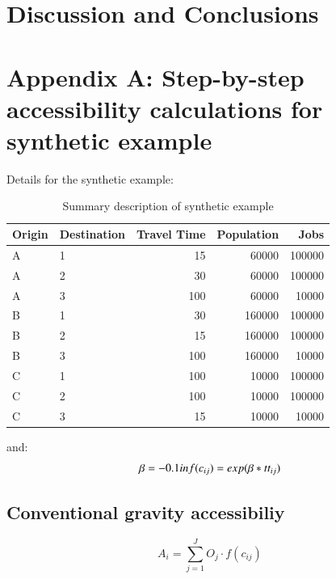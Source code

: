 \documentclass[]{elsarticle} %
\begin{document}
\newpage

\hypertarget{discussion-and-conclusions}{%
\section{Discussion and Conclusions}\label{discussion-and-conclusions}}

\hypertarget{appendix-a-step-by-step-accessibility-calculations-for-synthetic-example}{%
\section{Appendix A: Step-by-step accessibility calculations for
synthetic
example}\label{appendix-a-step-by-step-accessibility-calculations-for-synthetic-example}}

Details for the synthetic example:

\begin{table}

\caption{\label{tab:toy-example-table-appendix}\label{tab:toy-example}Summary description of synthetic example}
\centering
\begin{tabular}[t]{llrrr}
\toprule
Origin & Destination & Travel Time & Population & Jobs\\
\midrule
A & 1 & 15 & 60000 & 100000\\
A & 2 & 30 & 60000 & 100000\\
A & 3 & 100 & 60000 & 10000\\
B & 1 & 30 & 160000 & 100000\\
B & 2 & 15 & 160000 & 100000\\
\addlinespace
B & 3 & 100 & 160000 & 10000\\
C & 1 & 100 & 10000 & 100000\\
C & 2 & 100 & 10000 & 100000\\
C & 3 & 15 & 10000 & 10000\\
\bottomrule
\end{tabular}
\end{table}

\noindent and: \[
\beta = -0.1 \space in \space f(c_{ij}) = exp(\beta *tt_{ij})
\]

\hypertarget{conventional-gravity-accessibiliy}{%
\subsection{Conventional gravity
accessibiliy}\label{conventional-gravity-accessibiliy}}

\[
A_i = \sum_{j=1}^JO_j \cdot f(c_{ij})
\]
\end{document}
